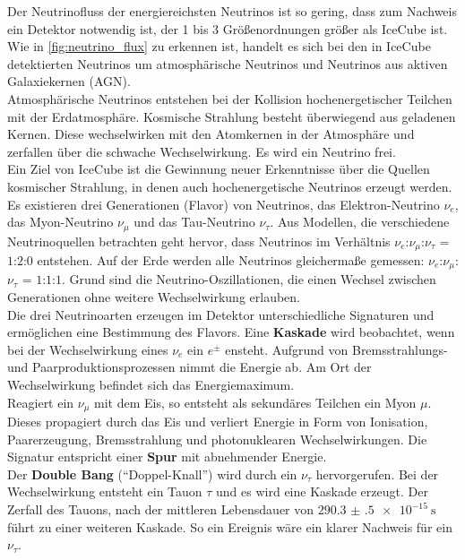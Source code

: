 Der Neutrinofluss der energiereichsten Neutrinos ist so gering, dass zum Nachweis ein Detektor notwendig ist, der 1 bis 3 Größenordnungen größer als IceCube ist.
Wie in \autoref{fig:neutrino_flux} zu erkennen ist, handelt es sich bei den in IceCube detektierten Neutrinos um atmosphärische Neutrinos und Neutrinos aus aktiven Galaxiekernen (AGN).
\\
Atmosphärische Neutrinos entstehen bei der Kollision hochenergetischer Teilchen mit der Erdatmosphäre.
Kosmische Strahlung besteht überwiegend aus geladenen Kernen.
Diese wechselwirken mit den Atomkernen in der Atmosphäre und zerfallen über die schwache Wechselwirkung.
Es wird ein Neutrino frei.
\\
Ein Ziel von IceCube ist die Gewinnung neuer Erkenntnisse über die Quellen kosmischer Strahlung, in denen auch hochenergetische Neutrinos erzeugt werden.
\\
Es existieren drei Generationen (Flavor) von Neutrinos, das Elektron-Neutrino $\nu_e$, das Myon-Neutrino $\nu_\mu$ und das Tau-Neutrino $\nu_\tau$.
Aus Modellen, die verschiedene Neutrinoquellen betrachten geht hervor, dass Neutrinos im Verhältnis $\nu_e$:$\nu_\mu$:$\nu_\tau$ = $1$:$2$:$0$ entstehen.
Auf der Erde werden alle Neutrinos gleichermaße gemessen: $\nu_e$:$\nu_\mu$:$\nu_\tau$ = $1$:$1$:$1$.
Grund sind die Neutrino-Oszillationen\cite{oscillation_bilenky,oscillation_wolfenstein}, die einen Wechsel zwischen Generationen ohne weitere Wechselwirkung erlauben.
\\
Die drei Neutrinoarten erzeugen im Detektor unterschiedliche Signaturen und ermöglichen eine Bestimmung des Flavors.
Eine \textbf{Kaskade}\cite{signature_e} wird beobachtet, wenn bei der Wechselwirkung eines $\nu_e$ ein $e^{\pm}$ ensteht.
Aufgrund von Bremsstrahlungs- und Paarproduktionsprozessen nimmt die Energie ab.
Am Ort der Wechselwirkung befindet sich das Energiemaximum.
\\
Reagiert ein $\nu_\mu$ mit dem Eis, so entsteht als sekundäres Teilchen ein Myon $\mu$.
Dieses propagiert durch das Eis und verliert Energie in Form von Ionisation, Paarerzeugung, Bremsstrahlung und photonuklearen Wechselwirkungen.
Die Signatur entspricht einer \textbf{Spur} mit abnehmender Energie.
\\
Der \textbf{Double Bang} ("`Doppel-Knall"') wird durch ein $\nu_\tau$ hervorgerufen.
Bei der Wechselwirkung entsteht ein Tauon $\tau$ und es wird eine Kaskade erzeugt.
Der Zerfall des Tauons, nach der mittleren Lebensdauer von $\SI{290.3(5)e-15}{\second}$ \cite{pdg} führt zu einer weiteren Kaskade.
So ein Ereignis wäre ein klarer Nachweis für ein $\nu_\tau$.